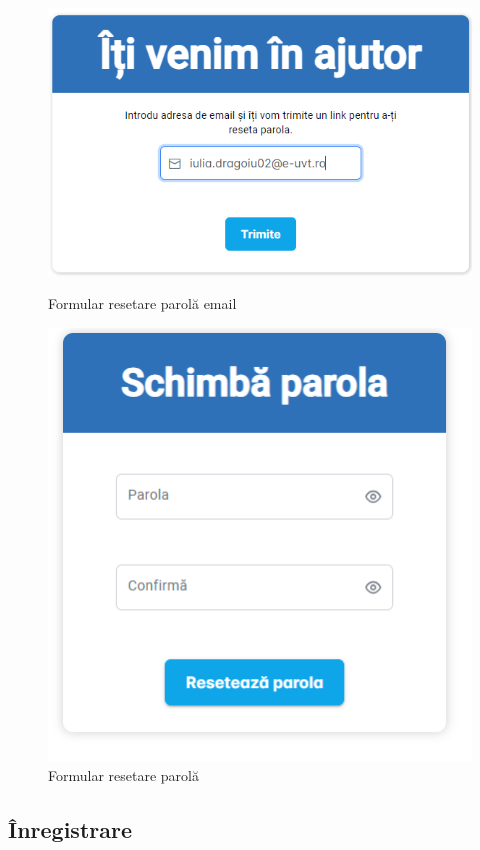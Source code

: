 \documentclass[12pt,a4paper]{report}
\theoremstyle{definition}
\theoremstyle{remark}
\begin{document}
\begin{figure}[H]
    \centering
    \begin{minipage}{.5\textwidth}
        \centering
        \includegraphics[width=.8\linewidth]{resurse/ghid_utilizare/resetare_parola_email.png}
        \caption{Formular resetare parolă email}

    \end{minipage}%
    \begin{minipage}{.5\textwidth}
        \centering
        \includegraphics[width=.8\linewidth]{resurse/ghid_utilizare/parola_uitata_formular.png}
        \caption{Formular resetare parolă }

    \end{minipage}
\end{figure}



\subsection{Înregistrare}
\end{document}
